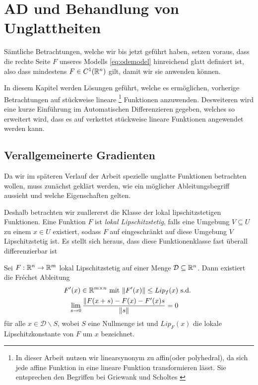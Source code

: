 \chapter{AD und Behandlung von Unglattheiten}
 Sämtliche Betrachtungen, welche wir bis jetzt geführt haben, setzen voraus, dass die rechte Seite $F$ unseres Modells \eqref{eq:odemodel} hinreichend glatt definiert ist, also dass mindestens $F\in C^1(\mathbb{R}^n)$ gilt, damit wir sie anwenden können. 

In diesem Kapitel werden Lösungen geführt, welche es ermöglichen, vorherige Betrachtungen auf stückweise lineare
\footnote{In dieser Arbeit nutzen wir \glqq linear\grqq synonym zu \glqq affin\grqq (oder \glqq polyhedral\grqq), da sich jede affine Funktion in eine lineare Funktion  transformieren lässt. Sie entsprechen den Begriffen bei Griewank \cite{monster} und Scholtes \cite{scholtes2012introduction}}
Funktionen
anzuwenden. Desweiteren wird eine kurze Einführung im Automatischen Differenzieren gegeben, welches so erweitert wird, dass es auf verkettet stückweise lineare Funktionen angewendet werden kann.
\section{Verallgemeinerte Gradienten}
Da wir im späteren Verlauf der Arbeit spezielle unglatte Funktionen betrachten wollen, muss zunächst geklärt werden, wie ein möglicher Ableitungsbegriff aussieht und welche Eigenschaften gelten.

Deshalb betrachten wir zuallererst die Klasse der lokal lipschitzstetigen Funktionen. Eine Funktion $F$ ist \textit{lokal Lipschitzstetig}, falls eine Umgebung $V\subseteq U$ zu einem $x\in U$ existiert, sodass $F$ auf eingeschränkt auf diese Umgebung $V$ Lipschitzstetig ist.
Es stellt sich heraus, dass diese Funktionenklasse fast überall differenzierbar ist \cite[S.216 ff]{federer1969geometric}
\begin{theorem}[Rademacher]
\label{thm:rademacher}
 Sei $F:\mathbb{R}^n\to \mathbb{R}^m$ lokal Lipschitzstetig auf einer Menge $\mathcal D\subseteq \mathbb{R}^n$. Dann existiert die Fréchet Ableitung 
 \[
 \begin{aligned}
  F'(x)\in \mathbb{R}^{m\times n} \text{ mit } \|F'(x)\|  \leq Lip_f(x) & \text{ s.d. }\\
   \lim_{s\to 0}\frac{\|F(x+s)-F(x)-F'(x)s}{\|s\|} = 0&
  \end{aligned}
 \]
für alle $x\in \mathcal D\backslash S$, wobei $S$ eine Nullmenge ist und $Lip_F(x)$ die lokale Lipschitzkonstante von $F$ um $x$ bezeichnet.
\end{theorem}


